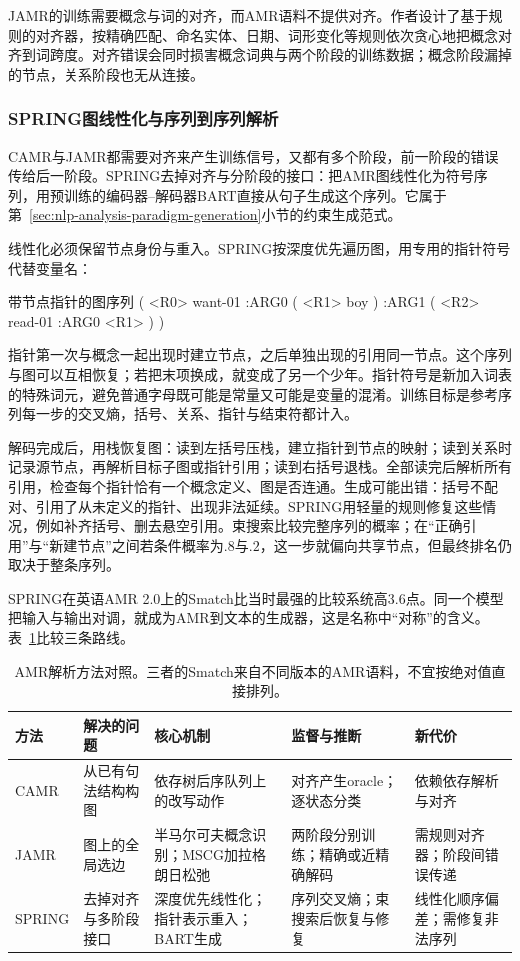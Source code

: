 JAMR的训练需要概念与词的对齐，而AMR语料不提供对齐。作者设计了基于规则的对齐器，按精确匹配、命名实体、日期、词形变化等规则依次贪心地把概念对齐到词跨度。对齐错误会同时损害概念词典与两个阶段的训练数据；概念阶段漏掉的节点，关系阶段也无从连接。

\subsubsection{SPRING图线性化与序列到序列解析}
\label{sec:nlp-analysis-spring}

CAMR与JAMR都需要对齐来产生训练信号，又都有多个阶段，前一阶段的错误传给后一阶段。SPRING去掉对齐与分阶段的接口：把AMR图线性化为符号序列，用预训练的编码器--解码器BART直接从句子生成这个序列。它属于第~\ref{sec:nlp-analysis-paradigm-generation}小节的约束生成范式。

线性化必须保留节点身份与重入。SPRING按深度优先遍历图，用专用的指针符号代替变量名：
\begin{codeblock}{带节点指针的图序列}
( <R0> want-01
  :ARG0 ( <R1> boy )
  :ARG1 ( <R2> read-01 :ARG0 <R1> ) )
\end{codeblock}
指针第一次与概念一起出现时建立节点，之后单独出现的引用同一节点。这个序列与图可以互相恢复；若把末项换成，就变成了另一个少年。指针符号是新加入词表的特殊词元，避免普通字母既可能是常量又可能是变量的混淆。训练目标是参考序列每一步的交叉熵，括号、关系、指针与结束符都计入。

解码完成后，用栈恢复图：读到左括号压栈，建立指针到节点的映射；读到关系时记录源节点，再解析目标子图或指针引用；读到右括号退栈。全部读完后解析所有引用，检查每个指针恰有一个概念定义、图是否连通。生成可能出错：括号不配对、引用了从未定义的指针、出现非法延续。SPRING用轻量的规则修复这些情况，例如补齐括号、删去悬空引用。束搜索比较完整序列的概率；在“正确引用”与“新建节点”之间若条件概率为$.8$与$.2$，这一步就偏向共享节点，但最终排名仍取决于整条序列。

SPRING在英语AMR 2.0上的Smatch比当时最强的比较系统高3.6点。同一个模型把输入与输出对调，就成为AMR到文本的生成器，这是名称中“对称”的含义。表~\ref{tab:nlp-analysis-amr-methods}比较三条路线。

\begin{table}[htbp]
  \centering
  \begin{tabularx}{\linewidth}{@{}l XXXX@{}}
    \toprule
    方法&解决的问题&核心机制&监督与推断&新代价\\
    \midrule
    CAMR&从已有句法结构构图&依存树后序队列上的改写动作&对齐产生oracle；逐状态分类&依赖依存解析与对齐\\
    JAMR&图上的全局选边&半马尔可夫概念识别；MSCG加拉格朗日松弛&两阶段分别训练；精确或近精确解码&需规则对齐器；阶段间错误传递\\
    SPRING&去掉对齐与多阶段接口&深度优先线性化；指针表示重入；BART生成&序列交叉熵；束搜索后恢复与修复&线性化顺序偏差；需修复非法序列\\
    \bottomrule
  \end{tabularx}
  \caption{AMR解析方法对照。三者的Smatch来自不同版本的AMR语料，不宜按绝对值直接排列。}
  \label{tab:nlp-analysis-amr-methods}
\end{table}

